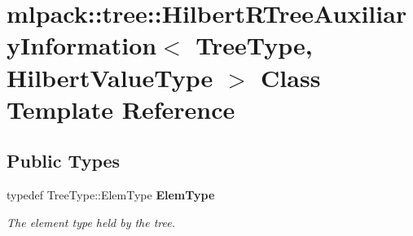 \section{mlpack\+:\+:tree\+:\+:Hilbert\+R\+Tree\+Auxiliary\+Information$<$ Tree\+Type, Hilbert\+Value\+Type $>$ Class Template Reference}
\label{classmlpack_1_1tree_1_1HilbertRTreeAuxiliaryInformation}
\subsection*{Public Types}
\begin{DoxyCompactItemize}
\item 
typedef Tree\+Type\+::\+Elem\+Type {\bf Elem\+Type}
\begin{DoxyCompactList}\small\item\em The element type held by the tree. \end{DoxyCompactList}\end{DoxyCompactItemize}

